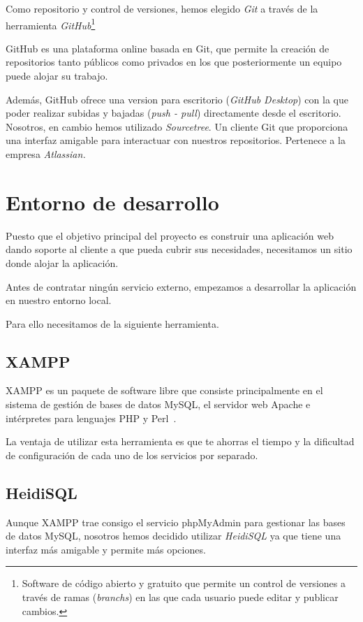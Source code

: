 Como repositorio y control de versiones, hemos elegido \textit{Git} a través de la herramienta \textit{GitHub}\footnote{Software de código abierto y gratuito que permite un control de versiones a través de ramas (\textit{branchs}) en las que cada usuario puede editar y publicar cambios.}

GitHub es una plataforma online basada en Git, que permite la creación de repositorios tanto públicos como privados en los que posteriormente un equipo puede alojar su trabajo.

Además, GitHub ofrece una version para escritorio (\textit{GitHub Desktop}) con la que poder realizar subidas y bajadas (\textit{push - pull}) directamente desde el escritorio. Nosotros, en cambio hemos utilizado \textit{Sourcetree}. Un cliente Git que proporciona una interfaz amigable para interactuar con nuestros repositorios. Pertenece a la empresa \textit{Atlassian.}

\newpage

\section{Entorno de desarrollo}

Puesto que el objetivo principal del proyecto es construir una aplicación web dando soporte al cliente a que pueda cubrir sus necesidades, necesitamos un sitio donde alojar la aplicación. 

Antes de contratar ningún servicio externo, empezamos a desarrollar la aplicación en nuestro entorno local. 

Para ello necesitamos de la siguiente herramienta.

\subsection{XAMPP}

XAMPP es un paquete de software libre que consiste principalmente en el sistema de gestión de bases de datos MySQL, el servidor web Apache e intérpretes para lenguajes PHP y Perl~\cite{wiki:xampp}.

La ventaja de utilizar esta herramienta es que te ahorras el tiempo y la dificultad de configuración de cada uno de los servicios por separado. 

\subsection{HeidiSQL}

Aunque XAMPP trae consigo el servicio phpMyAdmin para gestionar las bases de datos MySQL, nosotros hemos decidido utilizar \textit{HeidiSQL} ya que tiene una interfaz más amigable y permite más opciones.

